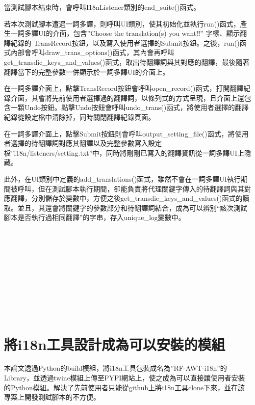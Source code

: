 當測試腳本結束時，會呼叫I18nListener類別的end\_suite()函式。

若本次測試腳本遭遇一詞多譯，則呼叫UI類別，使其初始化並執行run()函式，產生一詞多譯UI的介面，包含”Choose the translation(s) you want!!” 字樣、顯示翻譯紀錄的 TransRecord按鈕，以及寫入使用者選擇的Submit按鈕。之後，run()函式內部會呼叫draw\_trans\_options()函式，其內會再呼叫get\_transdic\_keys\_and\_values()函式，取出待翻譯詞與其對應的翻譯，最後隨著翻譯當下的完整參數一併顯示於一詞多譯UI的介面上。

在一詞多譯介面上，點擊TransRecord按鈕會呼叫open\_record()函式，打開翻譯紀錄介面，其會將先前使用者選擇過的翻譯詞，以條列式的方式呈現，且介面上還包含一顆Undo按鈕。點擊Undo按鈕會呼叫undo\_trans()函式，將使用者選擇的翻譯紀錄從設定檔中清除掉，同時關閉翻譯紀錄頁面。

在一詞多譯介面上，點擊Submit按鈕則會呼叫output\_setting\_file()函式，將使用者選擇的待翻譯詞對應其翻譯以及完整參數寫入設定檔”i18n/listeners/setting.txt”中，同時將剛剛已寫入的翻譯資訊從一詞多譯UI上隱藏。

此外，在UI類別中定義的add\_translations()函式，雖然不會在一詞多譯UI執行期間被呼叫，但在測試腳本執行期間，卻能負責將代理關鍵字傳入的待翻譯詞與其對應翻譯，分別儲存於變數中，方便之後get\_transdic\_keys\_and\_values()函式的讀取。並且，其還會將關鍵字的參數部分和待翻譯詞結合，成為可以辨別“該次測試腳本是否執行過相同翻譯”的字串，存入unique\_log變數中。

\hspace*{\fill} \\
\\ \hspace*{\fill} \\
\\ \hspace*{\fill} \\
\\ \hspace*{\fill} \\
\\ \hspace*{\fill} \\
\section{將i18n工具設計成為可以安裝的模組}
本論文透過Python的build模組，將i18n工具包裝成名為”RF-AWT-i18n”的Library，並透過twine模組上傳至PYPI\cite{PYPI}網站上，使之成為可以直接讓使用者安裝的Python模組。解決了先前使用者只能從github上將i18n工具clone下來，並在該專案上開發測試腳本的不方便。

